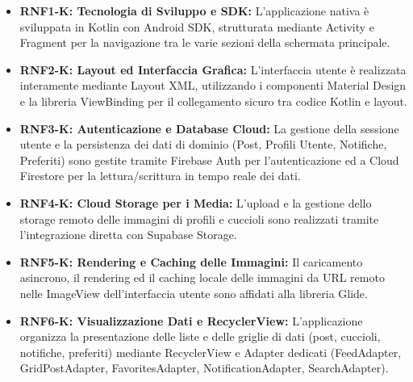 \documentclass[a4paper]{report}
\begin{document}
\begin{itemize}
    \item \textbf{RNF1-K: Tecnologia di Sviluppo e SDK:} L’applicazione nativa è sviluppata in Kotlin con Android SDK, strutturata mediante Activity e Fragment per la navigazione tra le varie sezioni della schermata principale.
    \item \textbf{RNF2-K: Layout ed Interfaccia Grafica:} L’interfaccia utente è realizzata interamente mediante Layout XML, utilizzando i componenti Material Design e la libreria ViewBinding per il collegamento sicuro tra codice Kotlin e layout.
    \item \textbf{RNF3-K: Autenticazione e Database Cloud:} La gestione della sessione utente e la persistenza dei dati di dominio (Post, Profili Utente, Notifiche, Preferiti) sono gestite tramite Firebase Auth per l'autenticazione ed a Cloud Firestore per la lettura/scrittura in tempo reale dei dati.
    \item \textbf{RNF4-K: Cloud Storage per i Media:} L'upload e la gestione dello storage remoto delle immagini di profili e cuccioli sono realizzati tramite l'integrazione diretta con Supabase Storage.
    \item \textbf{RNF5-K: Rendering e Caching delle Immagini:} Il caricamento asincrono, il rendering ed il caching locale delle immagini da URL remoto nelle ImageView dell'interfaccia utente sono affidati alla libreria Glide.
    \item \textbf{RNF6-K: Visualizzazione Dati e RecyclerView:} L'applicazione organizza la presentazione delle liste e delle griglie di dati (post, cuccioli, notifiche, preferiti) mediante RecyclerView e Adapter dedicati (FeedAdapter, GridPostAdapter, FavoritesAdapter, NotificationAdapter, SearchAdapter).
\end{itemize}
\end{document}
